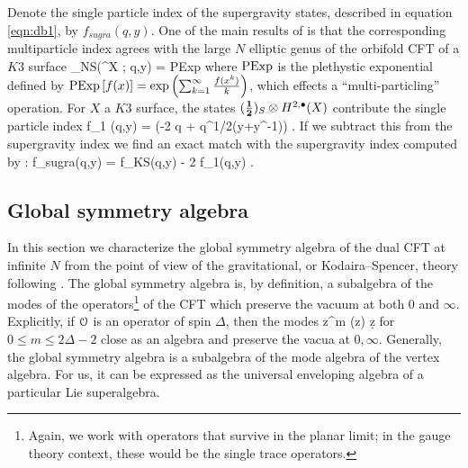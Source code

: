 \documentclass[../main.tex]{subfiles}
\begin{document}
Denote the single particle index of the supergravity states, described in equation \eqref{eqn:db1}, by $f_{sugra}(q,y)$. 
One of the main results of \cite{deBoerEG} is that the corresponding multiparticle index agrees with the large $N$ elliptic genus of the orbifold CFT of a $K3$ surface
\beqn
\chi_{NS}(\Sym^\infty X ; q,y) = {\rm PExp} 
\eeqn
where ${\rm PExp}$ is the plethystic exponential defined by ${\rm PExp}\left[f(x) \right] = {\rm exp}\left(\sum_{k=1}^{\infty} {f(x^k) \over k}\right)$, which effects a ``multi-particling'' operation.
For $X$ a $K3$ surface, the states $(\mathbf{\frac12})_S \otimes H^{2,{\bullet}}(X)$ contribute the single particle index
 f_1 (q,y) = \left(-2 q + q^{1/2}(y+y^{-1})\right) .
\eeqn
If we subtract this from the supergravity index we find an exact match with the supergravity index computed by \cite{deBoerEG}:
\beqn\label{eqn:sugraindex}
f_{sugra}(q,y) = f_{KS}(q,y) - 2 f_1(q,y) .
\eeqn

\subsection{Global symmetry algebra}\label{sec:globalsymm}

In this section we characterize the global symmetry algebra of the dual CFT at infinite $N$ from the point of view of the gravitational, or Kodaira--Spencer, theory following \cite{CP,CostelloGaiotto}. 
The global symmetry algebra is, by definition, a subalgebra of the modes of the operators\footnote{Again, we work with operators that survive in the planar limit; in the gauge theory context, these would be the single trace operators.} of the CFT which preserve the vacuum at both $0$ and $\infty$. 
Explicitly, if $\mathcal O$ is an operator of spin $\Delta$, then the modes
\beqn
\oint z^m \cO(z) \d z
\eeqn
for $0 \leq m \leq 2 \Delta - 2$ close as an algebra and preserve the vacua at $0,\infty$.
Generally, the global symmetry algebra is a subalgebra of the mode algebra of the vertex algebra.
For us, it can be expressed as the universal enveloping algebra of a particular Lie superalgebra.
\end{document}
